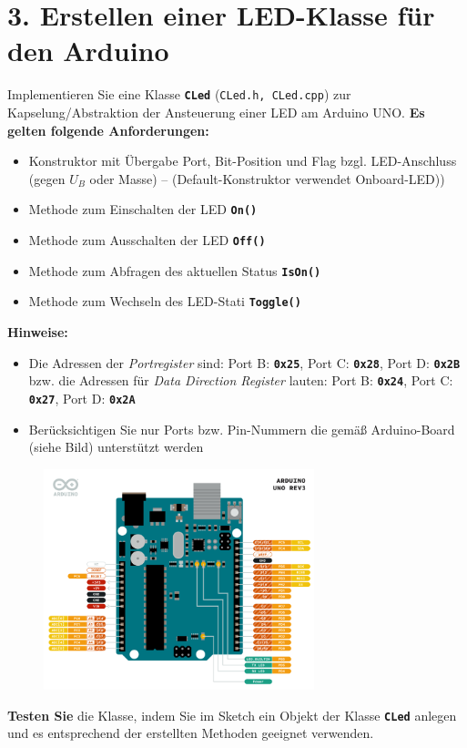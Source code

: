 \documentclass[
    fontsize=12pt,                      %
    paper=a4,                           %
    twoside=off,                       %
    DIV=15,                             %
    BCOR=12mm,                          %
    headings=normal,                    %
    headsepline=false,                   %
    footsepline=false,                  %
    headinclude=true,                   %
    footinclude=false,                  %
    toc=listof,                         %
    toc=bib,                            %
    chapterprefix=false,                %
    appendixprefix=false,               %
    numbers=noendperiod,                %
    captions=tableabove,                %
    footnotes=multiple,                 %
    bibliography=oldstyle,              %
    draft=false,                        %
]{scrreprt}
\newcommand{\Farbcode}[1]{\texttt{\textbf{\textcolor{myred}{#1}}}}
\begin{document}
\section*{3. Erstellen einer LED-Klasse für den Arduino}
Implementieren Sie eine Klasse \Farbcode{CLed} (\texttt{CLed.h, CLed.cpp}) zur Kapselung/Abstraktion der Ansteuerung einer LED am Arduino UNO.
\vskip 0.2cm 
\noindent \textbf{Es gelten folgende Anforderungen:}\begin{itemize}
\item Konstruktor mit Übergabe Port, Bit-Position und Flag bzgl. LED-Anschluss (gegen $U_B$ oder Masse) -- (Default-Konstruktor verwendet Onboard-LED))
\item Methode zum Einschalten der LED \Farbcode{On()}
\item Methode zum Ausschalten der LED \Farbcode{Off()}
\item Methode zum Abfragen des aktuellen Status \Farbcode{IsOn()}
\item Methode zum Wechseln des LED-Stati \Farbcode{Toggle()}
\end{itemize}
\vskip 0.2cm 
\noindent \textbf{Hinweise:}
\begin{itemize}
\item Die Adressen der \emph{Portregister} sind: Port B: \Farbcode{0x25}, Port C: \Farbcode{0x28}, Port D: \Farbcode{0x2B} bzw. die Adressen für \emph{Data Direction Register} lauten: Port B: \Farbcode{0x24}, Port C: \Farbcode{0x27}, Port D: \Farbcode{0x2A}
\item Berücksichtigen Sie nur Ports bzw. Pin-Nummern die gemäß Arduino-Board (siehe Bild) unterstützt werden
\end{itemize}

\begin{figure}[H]
	\centering
	\includegraphics[width=0.7\textwidth]{Figures/arduino}
\end{figure}
\noindent
\textbf{Testen Sie} die Klasse, indem Sie im Sketch ein Objekt der Klasse \Farbcode{CLed} anlegen und es entsprechend der erstellten Methoden geeignet verwenden.
\end{document}
